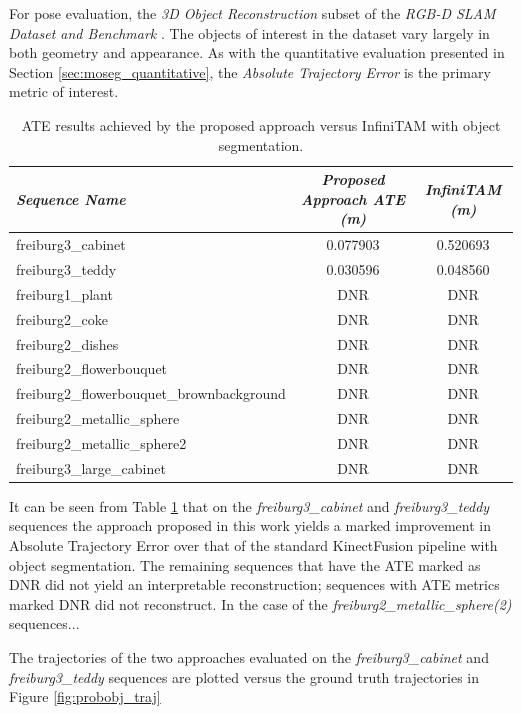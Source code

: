 For pose evaluation, the \textit{3D Object Reconstruction} subset of the 
\textit{RGB-D SLAM Dataset and Benchmark} \cite{Sturm2012}. The objects of interest in 
the dataset vary largely in both geometry and appearance. As with the quantitative 
evaluation presented in Section \ref{sec:moseg_quantitative}, the 
\textit{Absolute Trajectory Error} is the primary metric of interest.

\begin{table}[ht]
  \label{tbl:probobj_ate}
  \centering
  \begin{tabular}{l@{\hskip 1cm} c c}
    \emph{Sequence Name} & \emph{Proposed Approach ATE (m)} & \emph{InfiniTAM (m)}\\
    \midrule
    \textsf{freiburg3\_cabinet} & 0.077903 & 0.520693\\
    \textsf{freiburg3\_teddy}   & 0.030596 & 0.048560 \\
    \textsf{freiburg1\_plant}   & DNR & DNR \\
    \textsf{freiburg2\_coke}   & DNR & DNR \\
    \textsf{freiburg2\_dishes}   & DNR & DNR \\
    \textsf{freiburg2\_flowerbouquet}   & DNR & DNR \\
    \textsf{freiburg2\_flowerbouquet\_brownbackground}   & DNR & DNR \\
    \textsf{freiburg2\_metallic\_sphere}   & DNR & DNR \\
    \textsf{freiburg2\_metallic\_sphere2}   & DNR & DNR \\
    \textsf{freiburg3\_large\_cabinet}   & DNR & DNR
  \end{tabular}
  \caption[Probabilistic Object Reconstruction ATE]
  {ATE results achieved by the proposed approach versus InfiniTAM with object segmentation.}
\end{table}

It can be seen from Table \ref{tbl:probobj_ate} that on the \textit{freiburg3\_cabinet} 
and \textit{\textsf{freiburg3\_teddy}} sequences the approach proposed in this work 
yields a marked improvement in Absolute Trajectory Error over that of the standard KinectFusion 
pipeline with object segmentation. The remaining sequences that have the ATE marked as DNR did 
not yield an interpretable reconstruction; sequences with ATE metrics marked DNR did not 
reconstruct. In the case of the \textit{freiburg2\_metallic\_sphere(2)} sequences...

The trajectories of the two approaches evaluated on the \textit{freiburg3\_cabinet} 
and \textit{\textsf{freiburg3\_teddy}} sequences are plotted versus the ground truth trajectories 
in Figure \ref{fig:probobj_traj}

